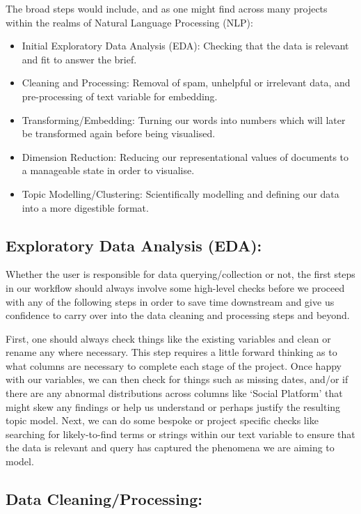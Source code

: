 \documentclass[
  letterpaper,
  DIV=11,
  numbers=noendperiod]{scrreprt}
\begin{document}
The broad steps would include, and as one might find across many
projects within the realms of Natural Language Processing (NLP):

\begin{itemize}
\item
  Initial Exploratory Data Analysis (EDA): Checking that the data is
  relevant and fit to answer the brief.
\item
  Cleaning and Processing: Removal of spam, unhelpful or irrelevant
  data, and pre-processing of text variable for embedding.
\item
  Transforming/Embedding: Turning our words into numbers which will
  later be transformed again before being visualised.
\item
  Dimension Reduction: Reducing our representational values of documents
  to a manageable state in order to visualise.
\item
  Topic Modelling/Clustering: Scientifically modelling and defining our
  data into a more digestible format.
\end{itemize}

\subsection{Exploratory Data Analysis
(EDA):}\label{exploratory-data-analysis-eda}

Whether the user is responsible for data querying/collection or not, the
first steps in our workflow should always involve some high-level checks
before we proceed with any of the following steps in order to save time
downstream and give us confidence to carry over into the data cleaning
and processing steps and beyond.

First, one should always check things like the existing variables and
clean or rename any where necessary. This step requires a little forward
thinking as to what columns are necessary to complete each stage of the
project. Once happy with our variables, we can then check for things
such as missing dates, and/or if there are any abnormal distributions
across columns like `Social Platform' that might skew any findings or
help us understand or perhaps justify the resulting topic model. Next,
we can do some bespoke or project specific checks like searching for
likely-to-find terms or strings within our text variable to ensure that
the data is relevant and query has captured the phenomena we are aiming
to model.

\subsection{Data Cleaning/Processing:}\label{data-cleaningprocessing}
\end{document}
